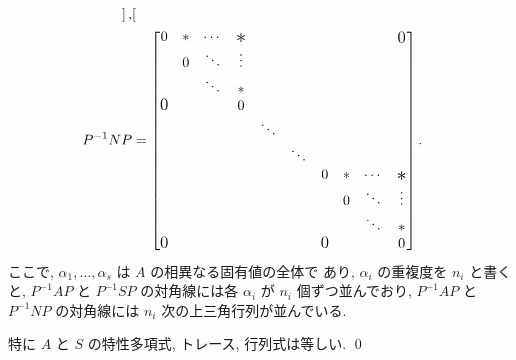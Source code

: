\documentclass[12pt,twoside]{jarticle}
\begin{document}
\begin{question}
{\begin{align*}
\begin{bmatrix}
    \end{bmatrix},
    \\
    P^{-1}NP &=
    \begin{bmatrix}
      0         & *        & \cdots & \bigstaru & & & & & & \bigzerou \\
                & 0        & \ddots & \vdots    & & & & & & \\
                &          & \ddots & *         & & & & & & \\
      \bigzerol &          &        & 0         & & & & & & \\
                & & & & \ddots & & & & \\
                & & & & & \ddots & & & \\
                & & & & & & 0         & *        & \cdots & \bigstaru \\
                & & & & & &           & 0        & \ddots & \vdots \\
                & & & & & &           &          & \ddots & * \\
      \bigzerol & & & & & & \bigzerol &          &        & 0 \\
    \end{bmatrix}.
  \end{align*}
  }ここで, $\alpha_1,\dots,\alpha_s$ は $A$ の相異なる固有値の全体で
  あり,  $\alpha_i$ の重複度を $n_i$ と書くと, $P^{-1}AP$ と $P^{-1}SP$ 
  の対角線には各 $\alpha_i$ が $n_i$ 個ずつ並んでおり,
  $P^{-1}AP$ と $P^{-1}NP$ の対角線には $n_i$ 次の上三角行列が並んでいる.

  特に $A$ と $S$ の特性多項式, トレース, 行列式は等しい.
  \qed
\end{question}
\end{document}
